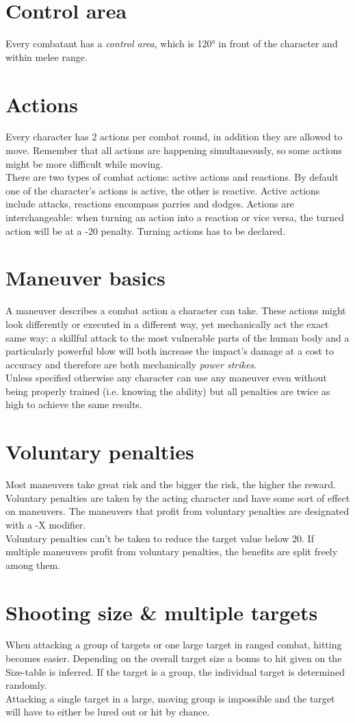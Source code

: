 \documentclass[12pt,a4paper,openany]{book}
\begin{document}
	\section{Control area}
	Every combatant has a \emph{control area}, which is 120° in front of the character and within melee range. 
	\section{Actions}
	Every character has 2 actions per combat round, in addition they are allowed to move. Remember that all actions are happening simultaneously, so some actions might be more difficult while moving.\\
	There are two types of combat actions: active actions and reactions. By default one of the character’s actions is active, the other is reactive. Active actions include attacks, reactions encompass parries and dodges. Actions are interchangeable: when turning an action into a reaction or vice versa, the turned action will be at a -20 penalty. Turning actions has to be declared.
	\section{Maneuver basics}
	A maneuver describes a combat action a character can take. These actions might look differently or executed in a different way, yet mechanically act the exact same way: a skillful attack to the most vulnerable parts of the human body and a particularly powerful blow will both increase the impact’s damage at a cost to accuracy and therefore are both mechanically \textit{power strikes}.\\
	Unless specified otherwise any character can use any maneuver even without being properly trained (i.e. knowing the ability) but all penalties are twice as high to achieve the same results.
	\section{Voluntary penalties}
	Most maneuvers take great risk and the bigger the risk, the higher the reward. Voluntary penalties are taken by the acting character and have some sort of effect on maneuvers. The maneuvers that profit from voluntary penalties are designated with a -X modifier.\\
	Voluntary penalties can’t be taken to reduce the target value below 20. If multiple maneuvers profit from voluntary penalties, the benefits are split freely among them.
	\section{Shooting size \& multiple targets}
	When attacking a group of targets or one large target in ranged combat, hitting becomes easier. Depending on the overall target size a bonus to hit given on the Size-table is inferred. If the target is a group, the individual target is determined randomly.\\
	Attacking a single target in a large, moving group is impossible and the target will have to either be lured out or hit by chance.
\end{document}
